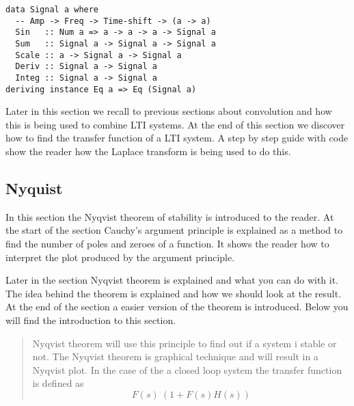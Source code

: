\begin{verbatim}
data Signal a where
  -- Amp -> Freq -> Time-shift -> (a -> a)
  Sin   :: Num a => a -> a -> a -> Signal a
  Sum   :: Signal a -> Signal a -> Signal a
  Scale :: a -> Signal a -> Signal a
  Deriv :: Signal a -> Signal a
  Integ :: Signal a -> Signal a
deriving instance Eq a => Eq (Signal a)
\end{verbatim}

Later in this section we recall to previous sections about convolution and how this is being used to combine LTI systems. At the end of this section we discover how to find the transfer function of a LTI system. A step by step guide with code show the reader how the Laplace transform is being used to do this. 

\subsection{Nyquist}
In this section the Nyqvist theorem of stability is introduced to the reader. At the start of the section Cauchy’s argument principle is explained as a method to find the number of poles and zeroes of a function. It shows the reader how to interpret the plot produced by the argument principle.

Later in the section Nyqvist theorem is explained and what you can do with it. The idea behind the theorem is explained and how we should look at the result. At the end of the section a easier version of the theorem is introduced. Below you will find the introduction to this section.

\blockquote{Nyqvist theorem will use this principle to find out if a system i stable or not. The Nyqvist theorem is graphical technique and will result in a Nyqvist plot. In the case of the a closed loop system the transfer function is defined as \begin{equation*}
    F(s) \ (1 + F(s)H(s))
\end{equation*}}

